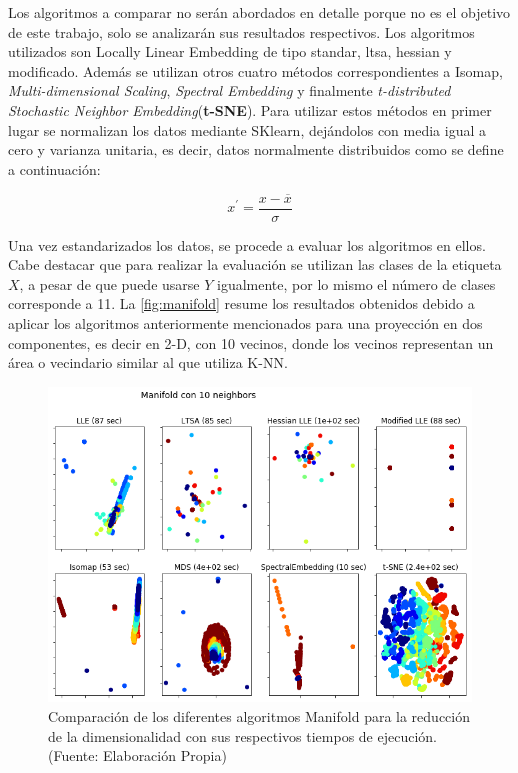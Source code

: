Los algoritmos a comparar no serán abordados en detalle porque no es el objetivo de este trabajo, solo se analizarán sus resultados respectivos. Los algoritmos utilizados son Locally Linear Embedding de tipo standar, ltsa, hessian y modificado. Además se utilizan otros cuatro métodos correspondientes a Isomap, \textit{Multi-dimensional Scaling}, \textit{Spectral Embedding} y finalmente \textit{t-distributed Stochastic Neighbor Embedding}(\textbf{t-SNE}). Para utilizar estos métodos en primer lugar se normalizan los datos mediante SKlearn, dejándolos con media igual a cero y varianza unitaria, es decir, datos normalmente distribuidos como se define a continuación:

\begin{equation} 
x^{'} = \frac{x- \overline{x}}{\sigma}
\end{equation}

Una vez estandarizados los datos, se procede a evaluar los algoritmos en ellos. Cabe destacar que para realizar la evaluación se utilizan las clases de la etiqueta $X$, a pesar de que puede usarse $Y$ igualmente, por lo mismo el número de clases corresponde a 11. La \autoref{fig:manifold} resume los resultados obtenidos debido a aplicar los algoritmos anteriormente mencionados para una proyección en dos componentes, es decir en 2-D, con 10 vecinos, donde los vecinos representan un área o vecindario similar al que utiliza K-NN.

\begin{figure}[ht!]
\centering
\includegraphics[width=.6\textwidth]{figures/manifold.png}
\caption[Comparación de los diferentes algoritmos Manifold Learning]{Comparación de los diferentes algoritmos Manifold para la reducción de la dimensionalidad con sus respectivos tiempos de ejecución. \\
{\scriptsize (Fuente: Elaboración Propia)}}
\label{fig:manifold}
\end{figure}


